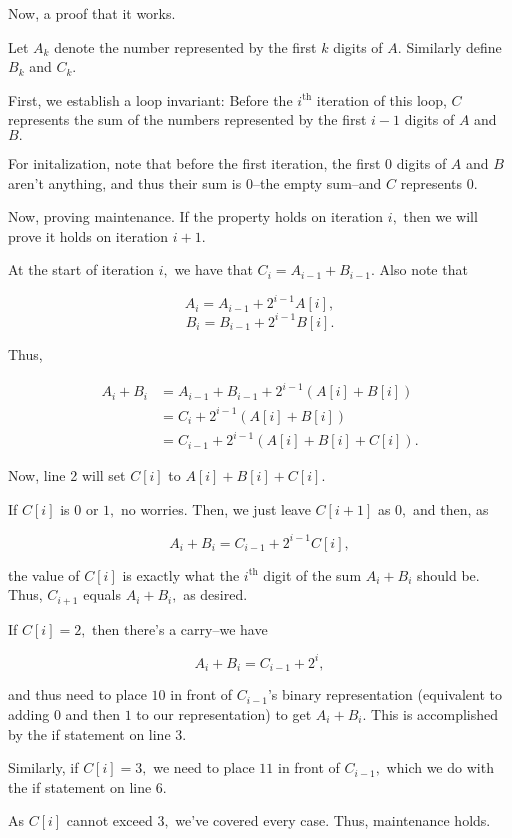 \documentclass{article}
\begin{document}
Now, a proof that it works. 

Let $A_{k}$ denote the number represented by the first $k$ digits of $A.$ Similarly define $B_{k}$ and $C_k.$

First, we establish a loop invariant: Before the $i^{\text{th}}$ iteration of this loop, $C$ represents the sum of the numbers represented by the first $i-1$ digits of $A$ and $B.$

For initalization, note that before the first iteration, the first $0$ digits of $A$ and $B$ aren't anything, and thus their sum is $0$--the empty sum--and $C$ represents $0.$

Now, proving maintenance. If the property holds on iteration $i,$ then we will prove it holds on iteration $i+1.$ 

At the start of iteration $i,$ we have that $C_i = A_{i-1} + B_{i-1}.$ Also note that

$$A_i = A_{i-1} + 2^{i-1}A[i],$$
$$B_i = B_{i-1} + 2^{i-1}B[i].$$

Thus,

\begin{align*}
	A_i + B_i &= A_{i-1} + B_{i-1} + 2^{i-1}(A[i]+B[i]) \\
		  &= C_i + 2^{i-1}(A[i]+B[i]) \\
		  &= C_{i-1} + 2^{i-1}(A[i]+B[i]+C[i]).
\end{align*}

Now, line 2 will set $C[i]$ to $A[i]+B[i]+C[i].$

If $C[i]$ is $0$ or $1,$ no worries. Then, we just leave $C[i+1]$ as $0,$ and then, as

$$A_i + B_i = C_{i-1} + 2^{i-1}C[i],$$

the value of $C[i]$ is exactly what the $i^{\text{th}}$ digit of the sum $A_i + B_i$ should be. Thus, $C_{i+1}$ equals $A_i + B_i,$ as desired. 

If $C[i] = 2,$ then there's a carry--we have

$$A_i + B_i = C_{i-1} + 2^{i},$$

and thus need to place $10$ in front of $C_{i-1}$'s binary representation (equivalent to adding $0$ and then $1$ to our representation) to get $A_i + B_i.$ This is accomplished by the if statement on line 3.

Similarly, if $C[i] = 3,$ we need to place $11$ in front of $C_{i-1},$ which we do with the if statement on line 6.

As $C[i]$ cannot exceed $3,$ we've covered every case. Thus, maintenance holds.
\end{document}
